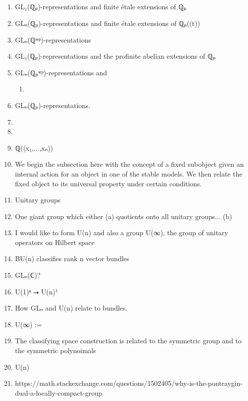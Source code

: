 \documentclass{book}
\newcounter{pcounter}
\newcounter{sectioncount}
\newcounter{subsectioncount}
\renewcommand{\section}[1]{\newpage\ \\ \ \\ \begin{center} \scalebox{1.5}{\texttt{\thesectioncount . #1}} \stepcounter{sectioncount} \setcounter{subsectioncount}{1} \end{center} \begin{center} \ \\ \ \\ \thispagestyle{empty} \end{center}}
\begin{document}
\section{}

\begin{enumerate}
\item GL₁(ℚₚ)-representations and finite étale extensions of ℚₚ
\item GLₙ(ℚₚ)-representations and finite étale extensions of ℚₚ((t))
\item GLₙ(ℚˢᵉᵖ)-representations
\item GL₁(ℚₚ)-representations and the profinite abelian extensions of ℚₚ
\item GLₙ(ℚₚˢᵉᵖ)-representations and 
\begin{enumerate}
\item 
\end{enumerate}
\item GLₙ(ℚₚ)-representations.
\item \iffalse https://math.dartmouth.edu/~eassaf/Coloquium_talk_-_p-adic_Langlands \fi
\item \iffalse https://math.stackexchange.com/questions/4767180/local-fields-vs-self-pontryagin-dual-locally-compact-fields-with-self-dual-schw/4773432?noredirect=1#comment10142552_4773432 \fi
\item ℚ((x₁,...,xₙ))
\item We begin the subsection here with the concept of a fixed subobject given an internal action for an object in one of the stable models. We then relate the fixed object to its universal property under certain conditions.
\item Unitary groups
\item One giant group which either (a) quotients onto all unitary groups... (b)
\item I would like to form U(n) and also a group U(∞), the group of unitary operators on Hilbert space
\item BU(n) classifies rank n vector bundles
\item GLₙ(ℂ)?
\item U(1)ⁿ ⭢ U(n)¹
\item How GLₙ and U(n) relate to bundles.
\item U(∞) := 
\item The classifying space construction is related to the symmetric group and to the symmetric polynoimals
\item U(n)
\item https://math.stackexchange.com/questions/1502405/why-is-the-pontraygin-dual-a-locally-compact-group
\end{enumerate}
\end{document}
